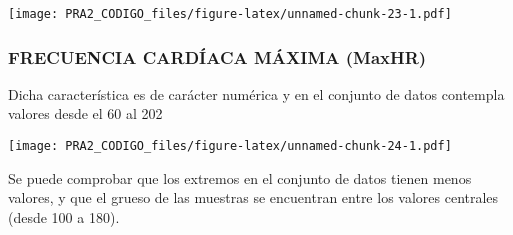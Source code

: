 \documentclass[
]{article}
\newenvironment{Shaded}{\begin{snugshade}}{\end{snugshade}}
\newcommand{\AttributeTok}[1]{\textcolor[rgb]{0.80,0.80,0.80}{#1}}
\newcommand{\ConstantTok}[1]{\textcolor[rgb]{0.86,0.64,0.64}{\textbf{#1}}}
\newcommand{\DecValTok}[1]{\textcolor[rgb]{0.86,0.86,0.80}{#1}}
\newcommand{\FloatTok}[1]{\textcolor[rgb]{0.75,0.75,0.82}{#1}}
\newcommand{\FunctionTok}[1]{\textcolor[rgb]{0.94,0.94,0.56}{#1}}
\newcommand{\NormalTok}[1]{\textcolor[rgb]{0.80,0.80,0.80}{#1}}
\newcommand{\OtherTok}[1]{\textcolor[rgb]{0.94,0.94,0.56}{#1}}
\newcommand{\SpecialCharTok}[1]{\textcolor[rgb]{0.86,0.64,0.64}{#1}}
\newcommand{\StringTok}[1]{\textcolor[rgb]{0.80,0.58,0.58}{#1}}
\begin{document}
\texttt{[image: PRA2\_CODIGO\_files/figure-latex/unnamed-chunk-23-1.pdf]}

\hypertarget{frecuencia-carduxedaca-muxe1xima-maxhr}{%
\subsubsection{FRECUENCIA CARDÍACA MÁXIMA
(MaxHR)}\label{frecuencia-carduxedaca-muxe1xima-maxhr}}

Dicha característica es de carácter numérica y en el conjunto de datos
contempla valores desde el 60 al 202

\begin{Shaded}
\end{Shaded}

\texttt{[image: PRA2\_CODIGO\_files/figure-latex/unnamed-chunk-24-1.pdf]}

Se puede comprobar que los extremos en el conjunto de datos tienen menos
valores, y que el grueso de las muestras se encuentran entre los valores
centrales (desde 100 a 180).
\end{document}
